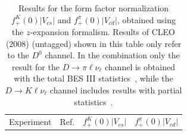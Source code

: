 \begin{table}[!htb]
\begin{center}
 \caption[]{Results for the form factor normalization
$f_+^K(0)|V_{cs}|$ and $f_+^{\pi}(0)|V_{cd}|$, obtained using the $z$-expansion formalism. 
Results of CLEO (2008) (untagged) shown in this table only refer to the $D^0$ channel.
In the combination only the result for the $D \to \pi \ell \nu_\ell $ channel is obtained 
with the total BES III statistics~\cite{BESIII-new}, while the $D \to K \ell \nu_\ell $ 
channel includes results with partial statistics~\cite{BESIII}.
 \label{norma}}
\begin{tabular}{c c c c}
\vspace*{-10pt} & \\
\hline
Experiment & Ref. & $f_+^K(0)|V_{cs}|$ & $f_+^{\pi}(0)|V_{cd}|$ \\
\hline\hline 

\end{tabular}
\end{center}
\end{table}
